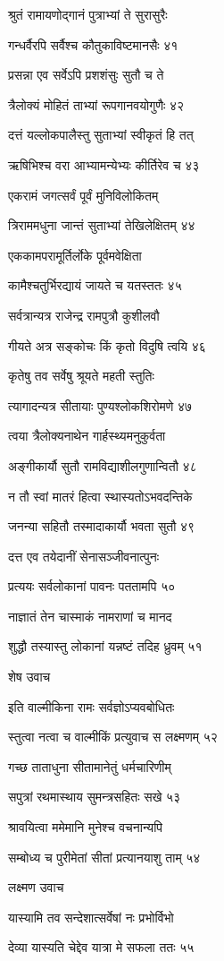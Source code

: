श्रुतं रामायणोद्गानं पुत्राभ्यां ते सुरासुरैः

गन्धर्वैरपि सर्वैश्च कौतुकाविष्टमानसैः ४१

प्रसन्ना एव सर्वेऽपि प्रशशंसुः सुतौ च ते

त्रैलोक्यं मोहितं ताभ्यां रूपगानवयोगुणैः ४२

दत्तं यल्लोकपालैस्तु सुताभ्यां स्वीकृतं हि तत्

ऋषिभिश्च वरा आभ्यामन्येभ्यः कीर्तिरेव च ४३

एकरामं जगत्सर्वं पूर्वं मुनिविलोकितम्

त्रिराममधुना जान्तं सुताभ्यां तेखिलेक्षितम् ४४

एककामपरामूर्तिर्लोके पूर्वमवेक्षिता

कामैश्चतुर्भिरद्यायं जायते च यतस्ततः ४५

सर्वत्रान्यत्र राजेन्द्र रामपुत्रौ कुशीलवौ

गीयते अत्र सङ्कोचः किं कृतो विदुषि त्वयि ४६

कृतेषु तव सर्वेषु श्रूयते महती स्तुतिः

त्यागादन्यत्र सीतायाः पुण्यश्लोकशिरोमणे ४७

त्वया त्रैलोक्यनाथेन गार्हस्थ्यमनुकुर्वता

अङ्गीकार्यौ सुतौ रामविद्याशीलगुणान्वितौ ४८

न तौ स्वां मातरं हित्वा स्थास्यतोऽभवदन्तिके

जनन्या सहितौ तस्मादाकार्यौ भवता सुतौ ४९

दत्त एव तयेदानीं सेनासञ्जीवनात्पुनः

प्रत्ययः सर्वलोकानां पावनः पततामपि ५०

नाज्ञातं तेन चास्माकं नामराणां च मानद

शुद्धौ तस्यास्तु लोकानां यन्नष्टं तदिह ध्रुवम् ५१

शेष उवाच

इति वाल्मीकिना रामः सर्वज्ञोऽप्यवबोधितः

स्तुत्वा नत्वा च वाल्मीकिं प्रत्युवाच स लक्ष्मणम् ५२

गच्छ ताताधुना सीतामानेतुं धर्मचारिणीम्

सपुत्रां रथमास्थाय सुमन्त्रसहितः सखे ५३

श्रावयित्वा ममेमानि मुनेश्च वचनान्यपि

सम्बोध्य च पुरीमेतां सीतां प्रत्यानयाशु ताम् ५४

लक्ष्मण उवाच

यास्यामि तव सन्देशात्सर्वेषां नः प्रभोर्विभो

देव्या यास्यति चेद्देव यात्रा मे सफला ततः ५५


